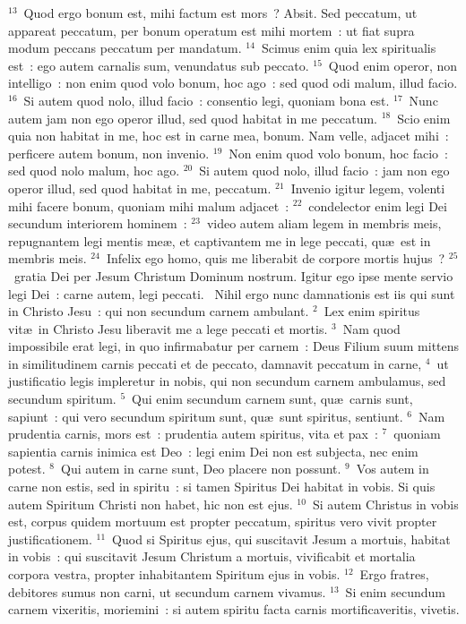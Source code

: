 ${}^{13}$~Quod ergo bonum est, mihi factum est mors~? Absit. Sed peccatum, ut appareat peccatum, per bonum operatum est mihi mortem~: ut fiat supra modum peccans peccatum per mandatum.
${}^{14}$~Scimus enim quia lex spiritualis est~: ego autem carnalis sum, venundatus sub peccato.
${}^{15}$~Quod enim operor, non intelligo~: non enim quod volo bonum, hoc ago~: sed quod odi malum, illud facio.
${}^{16}$~Si autem quod nolo, illud facio~: consentio legi, quoniam bona est.
${}^{17}$~Nunc autem jam non ego operor illud, sed quod habitat in me peccatum.
${}^{18}$~Scio enim quia non habitat in me, hoc est in carne mea, bonum. Nam velle, adjacet mihi~: perficere autem bonum, non invenio.
${}^{19}$~Non enim quod volo bonum, hoc facio~: sed quod nolo malum, hoc ago.
${}^{20}$~Si autem quod nolo, illud facio~: jam non ego operor illud, sed quod habitat in me, peccatum.
${}^{21}$~Invenio igitur legem, volenti mihi facere bonum, quoniam mihi malum adjacet~:
${}^{22}$~condelector enim legi Dei secundum interiorem hominem~:
${}^{23}$~video autem aliam legem in membris meis, repugnantem legi mentis me\ae , et captivantem me in lege peccati, qu\ae\ est in membris meis.
${}^{24}$~Infelix ego homo, quis me liberabit de corpore mortis hujus~?
${}^{25}$~gratia Dei per Jesum Christum Dominum nostrum. Igitur ego ipse mente servio legi Dei~: carne autem, legi peccati.
~Nihil ergo nunc damnationis est iis qui sunt in Christo Jesu~: qui non secundum carnem ambulant.
${}^{2}$~Lex enim spiritus vit\ae\ in Christo Jesu liberavit me a lege peccati et mortis.
${}^{3}$~Nam quod impossibile erat legi, in quo infirmabatur per carnem~: Deus Filium suum mittens in similitudinem carnis peccati et de peccato, damnavit peccatum in carne,
${}^{4}$~ut justificatio legis impleretur in nobis, qui non secundum carnem ambulamus, sed secundum spiritum.
${}^{5}$~Qui enim secundum carnem sunt, qu\ae\ carnis sunt, sapiunt~: qui vero secundum spiritum sunt, qu\ae\ sunt spiritus, sentiunt.
${}^{6}$~Nam prudentia carnis, mors est~: prudentia autem spiritus, vita et pax~:
${}^{7}$~quoniam sapientia carnis inimica est Deo~: legi enim Dei non est subjecta, nec enim potest.
${}^{8}$~Qui autem in carne sunt, Deo placere non possunt.
${}^{9}$~Vos autem in carne non estis, sed in spiritu~: si tamen Spiritus Dei habitat in vobis. Si quis autem Spiritum Christi non habet, hic non est ejus.
${}^{10}$~Si autem Christus in vobis est, corpus quidem mortuum est propter peccatum, spiritus vero vivit propter justificationem.
${}^{11}$~Quod si Spiritus ejus, qui suscitavit Jesum a mortuis, habitat in vobis~: qui suscitavit Jesum Christum a mortuis, vivificabit et mortalia corpora vestra, propter inhabitantem Spiritum ejus in vobis.
${}^{12}$~Ergo fratres, debitores sumus non carni, ut secundum carnem vivamus.
${}^{13}$~Si enim secundum carnem vixeritis, moriemini~: si autem spiritu facta carnis mortificaveritis, vivetis.


